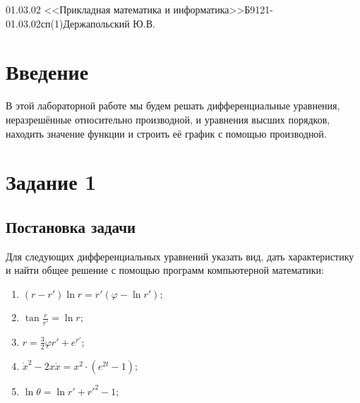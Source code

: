 \documentclass[14pt, a4paper, titlepage, fleqn]{extarticle}
\begin{document}
    {01.03.02 <<Прикладная математика и информатика>>}{Б9121-01.03.02сп(1)}{Держапольский Ю.В.}
    
    \tableofcontents

    \pagebreak

    \section{Введение}
        В этой лабораторной работе мы будем решать дифференциальные уравнения, неразрешённые относительно производной, и уравнения высших порядков, находить значение функции и строить её график с помощью производной.

    \pagebreak

    \section{Задание 1}
        \subsection{Постановка задачи}
            Для следующих дифференциальных уравнений указать вид, дать характеристику и найти общее решение с помощью программ компьютерной математики:

            \begin{enumerate}
                \item \( (r-r') \ln{r} = r' \left( \varphi - \ln{r'} \right); \)
                \item \( \tan{\frac{r}{r'}} = \ln{r}; \)
                \item \( r = \frac{3}{2} \varphi r' + e^{r'}; \)
                \item \( \dot{x}^2 - 2x \dot{x} = x^2 \cdot \left( e^{2t} - 1 \right); \)
                \item \( \ln{\theta} = \ln{r'} + r'^2 - 1; \)
            \end{enumerate}

        
\end{document}
